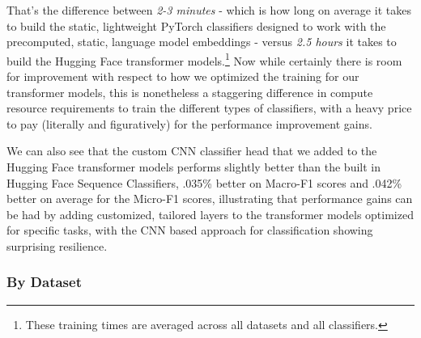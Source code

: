 \documentclass[final]{clv2025-revised}
\begin{document}
That's the difference between \textit{2-3 minutes} - which is how long on average it takes to build the static, lightweight PyTorch classifiers designed to work with the precomputed, static, language model embeddings - versus \textit{2.5 hours} it takes to build the Hugging Face transformer models.\footnote{These training times are averaged across all datasets and all classifiers.} Now while certainly there is room for improvement with respect to how we optimized the training for our transformer models, this is nonetheless a staggering difference in compute resource requirements to train the different types of classifiers, with a heavy price to pay (literally and figuratively) for the performance improvement gains.

We can also see that the custom CNN classifier head that we added to the Hugging Face transformer models performs slightly better than the built in Hugging Face Sequence Classifiers, .035\% better on Macro-F1 scores and .042\% better on average for the Micro-F1 scores, illustrating that performance gains can be had by adding customized, tailored layers to the transformer models optimized for specific tasks, with the CNN based approach for classification showing surprising resilience.

\subsubsection{By Dataset}
\end{document}
